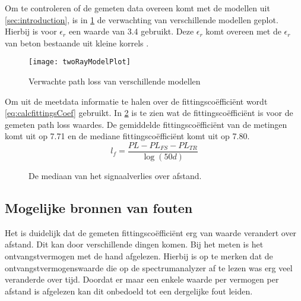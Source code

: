 Om te controleren of de gemeten data overeen komt met de modellen uit \cref{sec:introduction}, is in \cref{fig:modelPredictions} de verwachting van verschillende modellen geplot. Hierbij is voor $\epsilon_r$ een waarde van 3.4 gebruikt. Deze $\epsilon_r$ komt overeen met de $\epsilon_r$ van beton bestaande uit kleine korrels \cite{zhekov2020dielectric}.
\begin{figure}[ht]
    \centering
    \texttt{[image: twoRayModelPlot]}
    \caption{Verwachte path loss van verschillende modellen}
    \label{fig:modelPredictions}
\end{figure}

Om uit de meetdata informatie te halen over de fittingscoëfficiënt wordt \cref{eq:calcfittingsCoef} gebruikt. In \cref{fig:pathLossMesurment:fittingscoef} is te zien wat de fittingscoëfficiënt is voor de gemeten path loss waardes. De gemiddelde fittingscoëfficiënt van de metingen komt uit op 7.71 en de mediane fittingscoëfficiënt komt uit op 7.80.
\begin{equation} \label{eq:calcfittingsCoef}
    l_f=\frac{PL-PL_{FS}-PL_{TR}}{\log\left(50d\right)}
\end{equation}
\begin{figure}[ht]
    \centering
{}
\caption{De mediaan van het signaalverlies over afstand.}
\label{fig:pathLossMesurment:fittingscoef}
\end{figure}

\subsection{Mogelijke bronnen van fouten}
Het is duidelijk dat de gemeten fittingscoëfficiënt erg van waarde verandert over afstand. Dit kan door verschillende dingen komen. Bij het meten is het ontvangstvermogen met de hand afgelezen. Hierbij is op te merken dat de ontvangstvermogenswaarde die op de spectrumanalyzer af te lezen was erg veel veranderde over tijd. Doordat er maar een enkele waarde per vermogen per afstand is afgelezen kan dit onbedoeld tot een dergelijke fout leiden.

